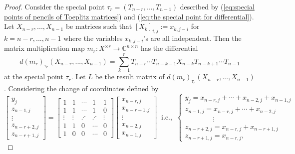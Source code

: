 \documentclass[reqno]{amsart}
\theoremstyle{definition}
\numberwithin{equation}{section}
\begin{document}
\begin{proof}
    Consider the special point $\tau_r=(T_{n-r},...,T_{n-1})$ described by (\ref{eq:special points of pencils of Toeplitz matrices}) and (\ref{eq:the special point for differential}). Let $X_{n-r},...,X_{n-1}$ be matrices such that $[X_k]_{i,j}:=x_{k,j-i}$ for $k=n-r,...,n-1$ where the variables $x_{k,j-i}$'s are all independent. Then the matrix multiplication map $m_r:X^{\times r} \rightarrow \mathbb{C}^{n \times n}$ has the differential 
\begin{equation*}
    d(m_r)_{\tau_r}(X_{n-r},...,X_{n-1})=\sum_{k=1}^{r}T_{n-r}\cdots T_{n-k-1}X_{n-k}T_{n-k+1}\cdots T_{n-1}
\end{equation*}
at the special point $\tau_r$. Let $L$ be the result matrix of $d(m_r)_{\tau_r}(X_{n-r},...,X_{n-1})$. Considering the change of coordinates defined by
\begin{equation}\label{eq:change of basis in main theorem}
    \begin{bmatrix}
        y_j\\
        z_{n-1,j}\\
        \vdots\\
        z_{n-r+2,j}\\
        z_{n-r+1,j}
    \end{bmatrix}=\begin{bmatrix}
            1 & 1 & \cdots & 1 & 1\\
            1 & 1 & \cdots & 1 & 0\\
            \vdots & \vdots & \iddots &\iddots & \vdots\\
            1 & 1 & 0 & \cdots & 0\\
            1 & 0 & 0 & \cdots & 0
        \end{bmatrix}\begin{bmatrix}
            x_{n-r,j}\\
            x_{n-r+1,j}\\
            \vdots\\
            x_{n-2,j}\\
            x_{n-1,j}
        \end{bmatrix}~\text{ i.e., }~\begin{cases}
            y_j=x_{n-r,j}+\cdots+x_{n-2,j}+x_{n-1,j}\\
            z_{n-1,j}=x_{n-r,j}+\cdots+x_{n-2,j}\\
            \qquad\qquad\vdots\\
            z_{n-r+2,j}=x_{n-r,j}+x_{n-r+1,j}\\
            z_{n-r+1,j}=x_{n-r,j},

\end{cases}
\end{equation}
\end{proof}
\end{document}
